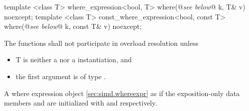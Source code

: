\begin{itemdecl}
template <class T> where_expression<bool, T> where(@\emph{see below}@ k, T& v) noexcept;
template <class T>
const_where_expression<bool, const T> where(@\emph{see below}@ k, const T& v) noexcept;
\end{itemdecl}
\begin{itemdescr}
  \pnum\remarks The functions shall not participate in overload resolution unless
  \begin{itemize}
    \item \type T is neither a \simd nor a \mask instantiation, and
    \item the first argument is of type \bool.
  \end{itemize}
  \pnum\returns A where expression object \ref{sec:simd.whereexpr} as if the exposition-only data members  and  are initialized with  and  respectively.
\end{itemdescr}

